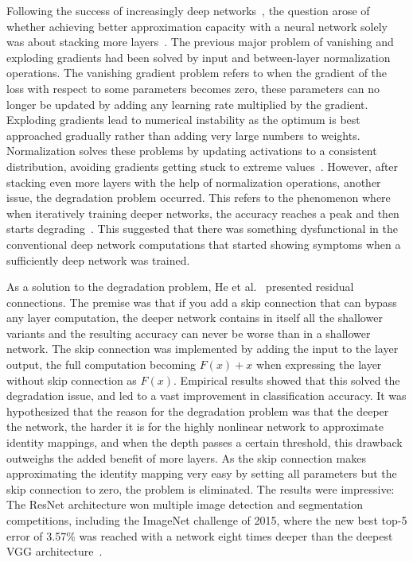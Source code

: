 \documentclass[english,twoside,openright]{UH_DS_MSc}
\begin{document}
Following the success of increasingly deep networks~\cite{vgg,googlelenet}, the question arose of whether 
achieving better approximation capacity with a neural network solely was about stacking more layers~\cite{resnet}.
The previous major problem of vanishing and exploding gradients had been solved by input and between-layer 
normalization operations. The vanishing gradient problem refers to when the gradient of the loss with respect to 
some parameters becomes zero, these parameters can no longer be updated by adding any learning rate multiplied by the gradient. Exploding 
gradients lead to numerical instability as the optimum is best approached gradually rather than adding very large numbers to weights. Normalization solves these problems by updating activations to a consistent distribution, avoiding gradients getting stuck to extreme values~\cite{batchnorm}.
However, after stacking even more layers with the help of normalization operations, another issue, the degradation 
problem occurred. This refers to the phenomenon where when iteratively training deeper networks, the accuracy 
reaches a peak and then starts degrading~\cite{resnet}. This suggested that there was something dysfunctional in 
the conventional deep network computations that started showing symptoms when a sufficiently deep network was trained.

As a solution to the degradation problem, He et al.~\cite{resnet} presented residual connections.
The premise was that if you add a skip connection that can bypass any layer computation, 
the deeper network contains in itself all the shallower variants and the resulting accuracy can never 
be worse than in a shallower network. The skip connection was implemented by adding the input to the layer output, the full computation becoming
$F(x) + x$ when expressing the layer without skip connection as $F(x)$.
Empirical results showed that this solved the degradation issue, and led to a 
vast improvement in classification accuracy. It was hypothesized that the reason for the degradation problem 
was that the deeper the network, the harder it is for the highly nonlinear network to approximate identity mappings, and when 
the depth passes a certain threshold, this drawback outweighs the added benefit of more layers. As the skip 
connection makes approximating the identity mapping very easy by setting all parameters but the skip connection to zero, the problem is eliminated. The results were impressive: 
The ResNet architecture won multiple image detection and segmentation competitions, including the ImageNet challenge 
of 2015, where the new best top-5 error of 3.57\% was reached with a network eight times deeper than the deepest VGG architecture~\cite{resnet}.
\end{document}
